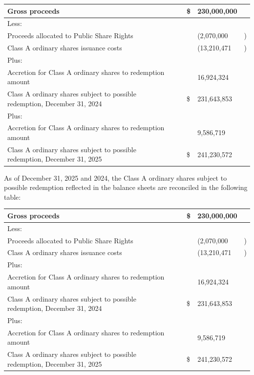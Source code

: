 \documentclass[11pt,a4paper]{article}
\begin{document}
\begin{table}[h]
\begin{tabular}{|l|l|l|l|l|}
\hline
Gross proceeds &  & \$ & 230,000,000 &  \\ \hline
Less: &  &  &  &  \\ \hline
Proceeds allocated to Public Share Rights &  &  & (2,070,000 & ) \\ \hline
Class A ordinary shares issuance costs &  &  & (13,210,471 & ) \\ \hline
Plus: &  &  &  &  \\ \hline
Accretion for Class A ordinary shares to redemption amount &  &  & 16,924,324 &  \\ \hline
Class A ordinary shares subject to possible redemption, December 31, 2024 &  & \$ & 231,643,853 &  \\ \hline
Plus: &  &  &  &  \\ \hline
Accretion for Class A ordinary shares to redemption amount &  &  & 9,586,719 &  \\ \hline
Class A ordinary shares subject to possible redemption, December 31, 2025 &  & \$ & 241,230,572 &  \\ \hline
\end{tabular}
\end{table}

As of December 31, 2025 and 2024, the Class A ordinary shares subject to possible redemption reflected in the balance sheets are reconciled in the following table:

\begin{table}[h]
\begin{tabular}{|l|l|l|l|l|}
\hline
Gross proceeds &  & \$ & 230,000,000 &  \\ \hline
Less: &  &  &  &  \\ \hline
Proceeds allocated to Public Share Rights &  &  & (2,070,000 & ) \\ \hline
Class A ordinary shares issuance costs &  &  & (13,210,471 & ) \\ \hline
Plus: &  &  &  &  \\ \hline
Accretion for Class A ordinary shares to redemption amount &  &  & 16,924,324 &  \\ \hline
Class A ordinary shares subject to possible redemption, December 31, 2024 &  & \$ & 231,643,853 &  \\ \hline
Plus: &  &  &  &  \\ \hline
Accretion for Class A ordinary shares to redemption amount &  &  & 9,586,719 &  \\ \hline
Class A ordinary shares subject to possible redemption, December 31, 2025 &  & \$ & 241,230,572 &  \\ \hline
\end{tabular}
\end{table}
\end{document}
